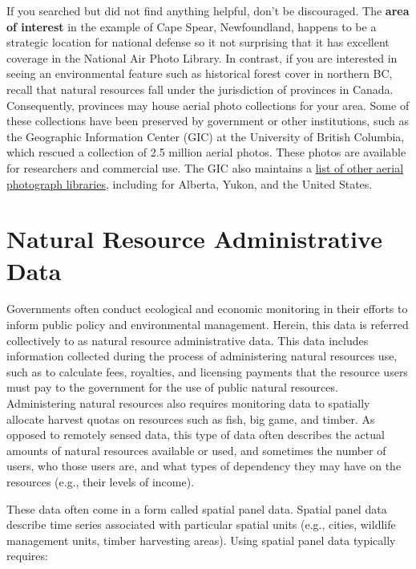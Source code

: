 \documentclass[
]{book}
\begin{document}
If you searched but did not find anything helpful, don't be discouraged. The \textbf{area of interest} in the example of Cape Spear, Newfoundland, happens to be a strategic location for national defense so it not surprising that it has excellent coverage in the National Air Photo Library. In contrast, if you are interested in seeing an environmental feature such as historical forest cover in northern BC, recall that natural resources fall under the jurisdiction of provinces in Canada. Consequently, provinces may house aerial photo collections for your area. Some of these collections have been preserved by government or other institutions, such as the Geographic Information Center (GIC) at the University of British Columbia, which rescued a collection of 2.5 million aerial photos. These photos are available for researchers and commercial use. The GIC also maintains a \href{https://gic.geog.ubc.ca/resources/air-photo-collection-and-services/other-sources-of-air-photo-information/}{list of other aerial photograph libraries}, including for Alberta, Yukon, and the United States.

\hypertarget{natural-resource-administrative-data}{%
\section{Natural Resource Administrative Data}\label{natural-resource-administrative-data}}

Governments often conduct ecological and economic monitoring in their efforts to inform public policy and environmental management. Herein, this data is referred collectively to as natural resource administrative data. This data includes information collected during the process of administering natural resources use, such as to calculate fees, royalties, and licensing payments that the resource users must pay to the government for the use of public natural resources. Administering natural resources also requires monitoring data to spatially allocate harvest quotas on resources such as fish, big game, and timber. As opposed to remotely sensed data, this type of data often describes the actual amounts of natural resources available or used, and sometimes the number of users, who those users are, and what types of dependency they may have on the resources (e.g., their levels of income).

These data often come in a form called spatial panel data. Spatial panel data describe time series associated with particular spatial units (e.g., cities, wildlife management units, timber harvesting areas). Using spatial panel data typically requires:
\end{document}
